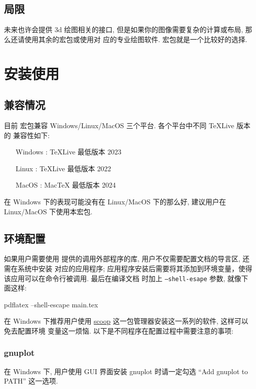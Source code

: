 \documentclass[
  hyper, lang=cn, 
  class=l3dox, 
]{../../zlatex/code/ztex}
\begin{document}
\subsection{局限}
\zTikZ{} 未来也许会提供 3d 绘图相关的接口, 但是如果你的图像需要复杂的计算或布局, 那么还请使用其余的宏包或使用对
应的专业绘图软件.  宏包就是一个比较好的选择.


\clearpage
\section{安装使用}
\subsection{兼容情况}
目前  宏包兼容 Windows/Linux/MacOS 三个平台. 各个平台中不同 \TeX{}Live 版本的
兼容性如下:

\hspace*{5cm}\parbox{\linewidth}{
\begin{itemize}
  \item [Windows] : \TeX{}Live 最低版本 2023
  \item [Linux] : \TeX{}Live 最低版本 2022
  \item [MacOS] : Mac\TeX{} 最低版本 2024
\end{itemize}}

\ztikz{} 在 Windows 下的表现可能没有在 Linux/MacOS 下的那么好, 建议用户在 Linux/MacOS 下使用本宏包.


\subsection{环境配置}
如果用户需要使用 \zTikZ{} 提供的调用外部程序的库, 用户不仅需要配置文档的导言区, 还需在系统中安装
对应的应用程序; 应用程序安装后需要将其添加到环境变量，使得该应用可以在命令行被调用. 最后在编译文档
时加上 \texttt{--shell-esape} 参数, 就像下面这样:
\def\exampleUR{}

\begin{DocExample}
  pdflatex --shell-escape main.tex
\end{DocExample}

在 Windows 下推荐用户使用 \href{https://scoop.sh/}{scoop} 这一包管理器安装这一系列的软件, 这样可以免去配置环境
变量这一烦恼. 以下是不同程序在配置过程中需要注意的事项:

\vspace*{-.5em}
\subsubsection{gnuplot}
在 Windows 下, 用户使用 GUI 界面安装 gnuplot 时请一定勾选 ``Add gnuplot to PATH'' 这一选项.
\end{document}
